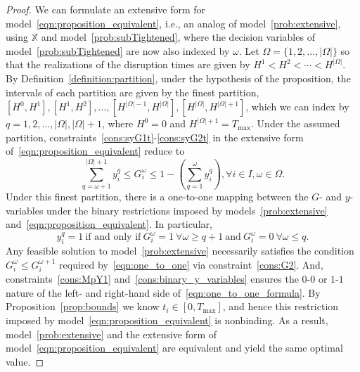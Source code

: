 \documentclass[11pt]{article}
\begin{document}
	\begin{proof}
		We can formulate an extensive form for model~\eqref{eqn:proposition_equivalent}, i.e., an analog of model~\eqref{prob:extensive}, using $\mathbb{X}$ and model~\eqref{prob:subTightened}, where the decision variables of model~\eqref{prob:subTightened} are now also indexed by $\omega$. Let $\Omega=\{1,2,\ldots,|\Omega|\}$ so that the realizations of the disruption times are given by $H^1 < H^2 < \cdots < H^{|\Omega|}$. By Definition~\ref{definition:partition}, under the hypothesis of the proposition, the intervals of each partition are given by the finest partition, $[H^0,H^1], [H^1,H^2], \ldots, [H^{|\Omega|-1},H^{|\Omega|}], [H^{|\Omega|},H^{|\Omega|+1}]$, which we can index by $q=1,2,\ldots,|\Omega|,|\Omega|+1$, where $H^0=0$ and $H^{|\Omega|+1}=T_{\max}$. Under the assumed partition, constraints~\eqref{cons:syG1t}-\eqref{cons:syG2t} in the extensive form of~\eqref{eqn:proposition_equivalent} reduce to
		\begin{equation}\label{eqn:one_to_one_formula}
		\sum_{q=\omega+1}^{|\Omega|+1} y_i^{q} \le G_i^\omega \le 1 - \left ( \sum_{q=1}^\omega y_i^{q} \right ), \forall i \in I, \omega \in \Omega.
		\end{equation}
		Under this finest partition, there is a one-to-one mapping between the $G$- and $y$-variables under the binary restrictions imposed by models~\eqref{prob:extensive} and~\eqref{eqn:proposition_equivalent}. In particular,  
		\begin{equation}\label{eqn:one_to_one}
		y_i^q=1 \ \mbox{if and only if} \  G_i^\omega=1 \  \forall \omega \ge q+1 \ \mbox{and} \ G_i^\omega=0 \ \forall \omega \le q. 
		\end{equation}
		Any feasible solution to model~\eqref{prob:extensive} necessarily satisfies the condition $G_i^{\omega} \le G_i^{\omega+1}$ required by~\eqref{eqn:one_to_one} via constraint~\eqref{cons:G2}. And, constraints~\eqref{cons:MpY1} and~\eqref{cons:binary_y_variables} ensures the $0$-$0$ or $1$-$1$ nature of the left- and right-hand side of~\eqref{eqn:one_to_one_formula}. By Proposition~\ref{prop:bounds} we know $t_i \in [0,T_{\max}]$, and hence this restriction imposed by model~\eqref{eqn:proposition_equivalent} is nonbinding. As a result, model~\eqref{prob:extensive} and the extensive form of model~\eqref{eqn:proposition_equivalent} are equivalent and yield the same optimal value. 
	\end{proof}
\end{document}
